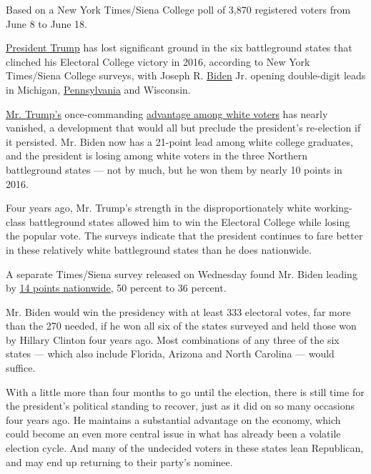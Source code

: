 Based on a New York Times/Siena College poll of 3,870 registered voters
from June 8 to June 18.

\href{https://www.nytimes.com/interactive/2020/us/elections/donald-trump.html}{President
Trump} has lost significant ground in the six battleground states that
clinched his Electoral College victory in 2016, according to New York
Times/Siena College surveys, with Joseph R.
\href{https://www.nytimes.com/2020/07/03/upshot/joe-biden-voters-coronavirus.html}{Biden}
Jr. opening double-digit leads in Michigan,
\href{https://www.nytimes.com/2020/07/02/us/politics/pennsylvania-trump-biden.html}{Pennsylvania}
and Wisconsin.

\href{https://www.nytimes.com/2020/07/02/us/politics/pennsylvania-trump-biden.html}{Mr.
Trump's} once-commanding
\href{https://www.nytimes.com/2020/06/29/us/politics/trump-swing-voters.html}{advantage
among white voters} has nearly vanished, a development that would all
but preclude the president's re-election if it persisted. Mr. Biden now
has a 21-point lead among white college graduates, and the president is
losing among white voters in the three Northern battleground states ---
not by much, but he won them by nearly 10 points in 2016.

Four years ago, Mr. Trump's strength in the disproportionately white
working-class battleground states allowed him to win the Electoral
College while losing the popular vote. The surveys indicate that the
president continues to fare better in these relatively white
battleground states than he does nationwide.

A separate Times/Siena survey released on Wednesday found Mr. Biden
leading by
\href{https://www.nytimes.com/2020/06/24/us/politics/trump-biden-poll-nyt-upshot-siena-college.html}{14
points nationwide}, 50 percent to 36 percent.

Mr. Biden would win the presidency with at least 333 electoral votes,
far more than the 270 needed, if he won all six of the states surveyed
and held those won by Hillary Clinton four years ago. Most combinations
of any three of the six states --- which also include Florida, Arizona
and North Carolina --- would suffice.

With a little more than four months to go until the election, there is
still time for the president's political standing to recover, just as it
did on so many occasions four years ago. He maintains a substantial
advantage on the economy, which could become an even more central issue
in what has already been a volatile election cycle. And many of the
undecided voters in these states lean Republican, and may end up
returning to their party's nominee.

